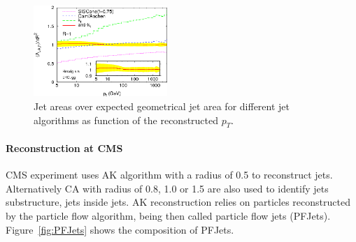 \begin{figure}[!Hhtbp]
  \begin{center}
    \includegraphics[width=0.45\textwidth]{figs/JetArea.png}
    \caption{Jet areas over expected geometrical jet area for different jet algorithms as function of the reconstructed $p_{T}$.}
    \label{fig:JetsAlgosArea}
  \end{center}
\end{figure}

\paragraph{Reconstruction at CMS}

CMS experiment uses AK algorithm with a radius of 0.5 to reconstruct jets. Alternatively CA with radius of 0.8, 1.0 or 1.5 are also used to identify jets substructure, jets inside jets. AK reconstruction relies on particles reconstructed by the particle flow algorithm, being then called particle flow jets (PFJets). Figure~\ref{fig:PFJets} shows the composition of PFJets.  

